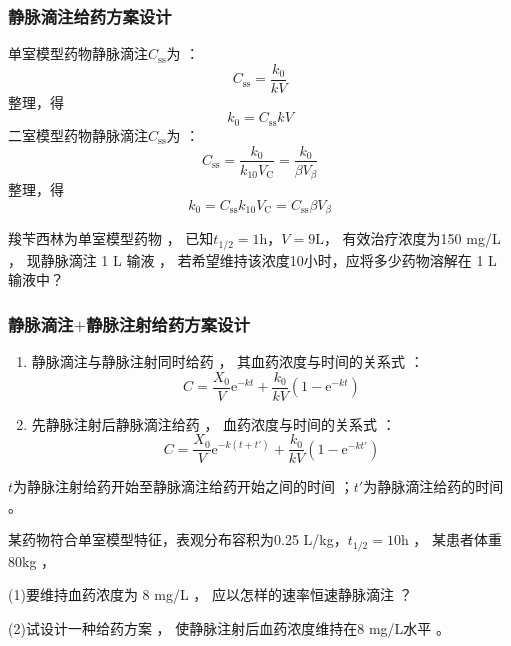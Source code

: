 \documentclass[dvipsnames, svgnames, x11names]{beamer}
\begin{document}
\begin{frame}
    \frametitle{静脉滴注给药方案设计}
    \begin{minipage}{0.48\linewidth}
    单室模型药物静脉滴注$C_{\mathrm{ss}}$为 ：
    \[
        C_{\mathrm{ss}} = \frac{k_0}{kV}
    \]
    整理，得
    \[
        k_0 = C_{\mathrm{ss}}kV
    \]
    二室模型药物静脉滴注$C_{\mathrm{ss}}$为 ：
    \[
        C_{\mathrm{ss}} = \frac{k_0}{k_{10}V_\mathrm{C}} = \frac{k_0}{\beta V_\beta}
    \]
    整理，得
    \[
        k_0 = C_{\mathrm{ss}}k_{10}V_\mathrm{C} = C_{\mathrm{ss}}\beta V_\beta
    \]
    \end{minipage}\hfill
    \begin{minipage}{0.48\linewidth}
        \begin{example}
            羧苄西林为单室模型药物 ， 已知$t_{1/2} = 1 \mathrm{h}$，$V = 9 \mathrm{L}$， 有效治疗浓度为150 mg/L ， 现静脉滴注 1 L 输液 ， 若希望维持该浓度10小时，应将多少药物溶解在 1 L 输液中？
        \end{example}
    \end{minipage}
    
\end{frame}



\begin{frame}
    \frametitle{静脉滴注$+$静脉注射给药方案设计}
    \begin{enumerate}
      \item 静脉滴注与静脉注射同时给药 ， 其血药浓度与时间的关系式 ：
      \[
        C=\frac{X_{0}}{V}\mathrm{e}^{-kt}+\frac{k_{0}}{kV}(1-\mathrm{e}^{-kt})
      \]
      \item 先静脉注射后静脉滴注给药 ， 血药浓度与时间的关系式 ：
      \[
        C = \frac{X_0}{V}\mathrm{e}^{-k(t+t')} +\frac{k_0}{kV}(1-\mathrm{e}^{-kt'})
      \]
    \end{enumerate}
    
    $t$为静脉注射给药开始至静脉滴注给药开始之间的时间 ；$t'$为静脉滴注给药的时间 。

    \begin{example}
        某药物符合单室模型特征，表观分布容积为0.25 L/kg，$t_{1/2}=10$h ， 某患者体重80kg ，
        
        (1)要维持血药浓度为 8 mg/L ， 应以怎样的速率恒速静脉滴注 ？ 
        
        (2)试设计一种给药方案 ， 使静脉注射后血药浓度维持在8 mg/L水平 。
    \end{example}
\end{frame}
\end{document}
